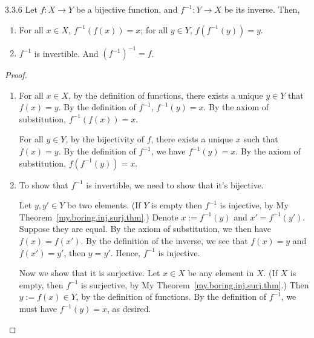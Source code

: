 \begin{exercise}{3.3.6}
	Let $f: X\to Y$ be a bijective function, and $f^{-1}: Y \to X$ be its inverse. Then,
	\begin{enumerate}
		\item For all $x \in X$, $f^{-1}(f(x)) = x$; for all $y \in Y$, $f(f^{-1}(y)) = y$.
		\item $f^{-1}$ is invertible. And $(f^{-1})^{-1} = f$.
	\end{enumerate}
\end{exercise}
\begin{proof}\leavevmode
	\begin{enumerate}
		\item For all $x \in X$, by the definition of functions, there exists a unique $y \in Y$ that $f(x) = y$. By the definition of $f^{-1}$, $f^{-1}(y) = x$. By the axiom of substitution, $f^{-1}(f(x)) = x$.
		
		For all $y \in Y$, by the bijectivity of $f$, there exists a unique $x$ such that $f(x) = y$. By the definition of $f^{-1}$, we have $f^{-1}(y) = x$. By the axiom of substitution, $f(f^{-1}(y)) = x$.
		
		\item To show that $f^{-1}$ is invertible, we need to show that it's bijective.
		
		Let $y,y' \in Y$ be two elements. (If $Y$ is empty then $f^{-1}$ is injective, by My Theorem~\ref{my.boring.inj.surj.thm}.) Denote $x := f^{-1}(y)$ and $x' = f^{-1}(y')$. Suppose they are equal. By the axiom of substitution, we then have $f(x) = f(x')$. By the definition of the inverse, we see that $f(x) = y$ and $f(x') = y'$, then $y = y'$. Hence, $f^{-1}$ is injective.
		
		Now we show that it is surjective. Let $x \in X$ be any element in $X$. (If $X$ is empty, then $f^{-1}$ is surjective, by My Theorem~\ref{my.boring.inj.surj.thm}.) Then $y := f(x) \in Y$, by the definition of functions. By the definition of $f^{-1}$, we must have $f^{-1}(y) = x$, as desired.
	\end{enumerate}
\end{proof}

